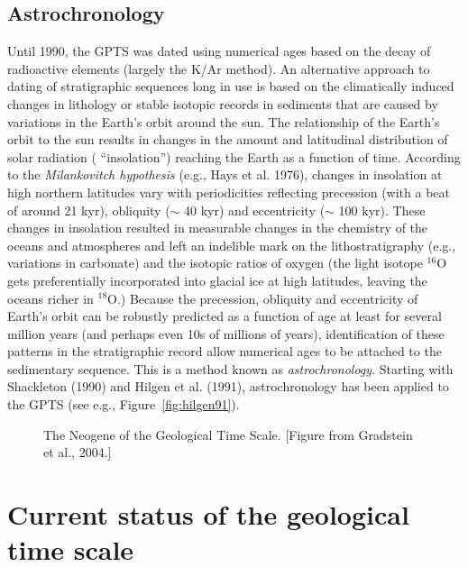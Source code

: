 \clearpage

\subsection{Astrochronology}

Until 1990, the GPTS was dated using numerical ages based on the decay of radioactive elements (largely the K/Ar method).  An alternative approach to dating of stratigraphic sequences long in  use  is based on the climatically induced changes in lithology or stable isotopic records in sediments that are caused by variations in the Earth's orbit around the sun.    The relationship of the Earth's orbit to the sun results in changes in the amount and latitudinal distribution of solar radiation ( ``insolation'') reaching the Earth as a function of time.  According to the
 {\it Milankovitch hypothesis} (e.g., 
 Hays et al. 1976), \nocite{hays76} changes in insolation at high northern latitudes vary with periodicities reflecting precession (with a beat of around 21 kyr), obliquity ($\sim$ 40 kyr) and eccentricity ($\sim$ 100 kyr).  These changes in insolation  resulted in measurable changes in the chemistry of the oceans and atmospheres and left an indelible mark on the lithostratigraphy (e.g., variations in carbonate) and the isotopic ratios of oxygen (the light isotope $^{16}$O gets preferentially incorporated into glacial ice at high latitudes, leaving the oceans richer in $^{18}$O.)  Because the precession, obliquity and eccentricity of Earth's orbit can be robustly predicted as a function of age at least for several million years (and perhaps even 10s of millions of years), identification of these patterns in the stratigraphic record allow numerical ages to be attached to the sedimentary sequence.  This is  a method known as 
 {\it astrochronology}.  
Starting with Shackleton (1990) and Hilgen et al. (1991), astrochronology has been applied to the GPTS (see e.g., Figure~\ref{fig:hilgen91}).    



\begin{figure}[h!tb]
\epsfxsize 13cm
\centering {}
\caption{The Neogene of the Geological Time Scale. [Figure from Gradstein et al., 2004.]}
\label{fig:neogene}
\end{figure}



\section {Current status of the geological time scale}

